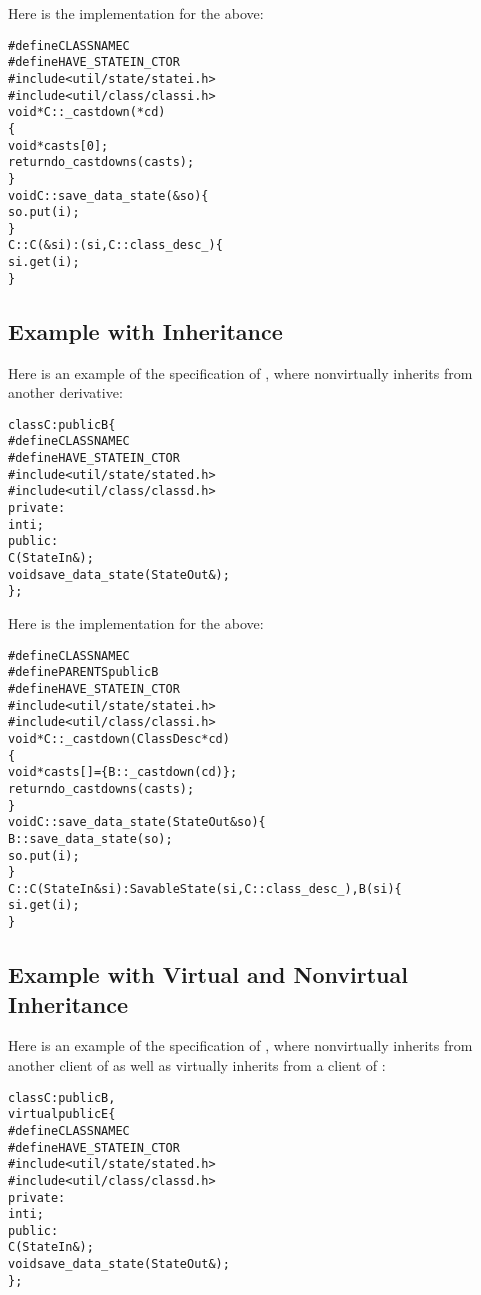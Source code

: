 Here is the implementation for the above:
\begin{alltt}
#define CLASSNAME C
#define HAVE_STATEIN_CTOR
#include <util/state/statei.h>
#include <util/class/classi.h>
void* C::_castdown(*cd)
  \{
  void* casts[0];
  return do_castdowns(casts);
  \}
void C::save_data_state(&so) \{
  so.put(i);
  \}
C::C(&si): (si,C::class_desc_) \{
  si.get(i);
  \}
\end{alltt}


\subsection{Example with Inheritance}

Here is an example of the specification of ,
where  nonvirtually inherits from another
 derivative:
\begin{alltt}
class C: public B \{
# define CLASSNAME C
# define HAVE_STATEIN_CTOR
# include <util/state/stated.h>
# include <util/class/classd.h>
  private:
    int i;
  public:
    C(StateIn&);
    void save_data_state(StateOut&);
  \};
\end{alltt}

Here is the implementation for the above:
\begin{alltt}
#define CLASSNAME C
#define PARENTS public B
#define HAVE_STATEIN_CTOR
#include <util/state/statei.h>
#include <util/class/classi.h>
void* C::_castdown(ClassDesc*cd)
  \{
  void* casts[] = \{ B::_castdown(cd) \};
  return do_castdowns(casts);
  \}
void C::save_data_state(StateOut&so) \{
  B::save_data_state(so);
  so.put(i);
  \}
C::C(StateIn&si): SavableState(si,C::class_desc_), B(si)  \{
  si.get(i);
  \}
\end{alltt}

\subsection{Example with Virtual and Nonvirtual Inheritance}

Here is an example of the specification of ,
where  nonvirtually inherits from another client of
 as well as virtually inherits from a client
of :
\begin{alltt}
class C: public B,
         virtual public E \{
# define CLASSNAME C
# define HAVE_STATEIN_CTOR
# include <util/state/stated.h>
# include <util/class/classd.h>
  private:
    int i;
  public:
    C(StateIn&);
    void save_data_state(StateOut&);
  \};
\end{alltt}

